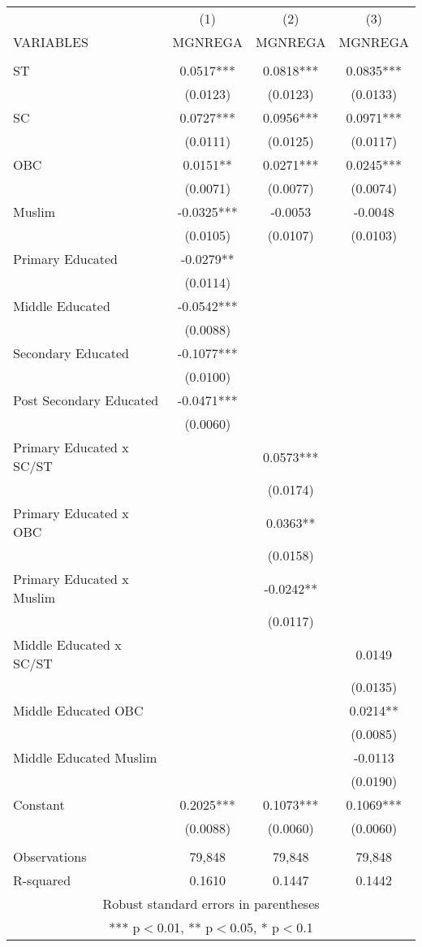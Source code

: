 \documentclass[]{article}
\begin{document}
\begin{tabular}{lccc} \hline
 & (1) & (2) & (3) \\
VARIABLES & MGNREGA & MGNREGA & MGNREGA \\ \hline
 &  &  &  \\
ST & 0.0517*** & 0.0818*** & 0.0835*** \\
 & (0.0123) & (0.0123) & (0.0133) \\
SC & 0.0727*** & 0.0956*** & 0.0971*** \\
 & (0.0111) & (0.0125) & (0.0117) \\
OBC & 0.0151** & 0.0271*** & 0.0245*** \\
 & (0.0071) & (0.0077) & (0.0074) \\
Muslim & -0.0325*** & -0.0053 & -0.0048 \\
 & (0.0105) & (0.0107) & (0.0103) \\
Primary Educated & -0.0279** &  &  \\
 & (0.0114) &  &  \\
Middle Educated & -0.0542*** &  &  \\
 & (0.0088) &  &  \\
Secondary Educated & -0.1077*** &  &  \\
 & (0.0100) &  &  \\
Post Secondary Educated & -0.0471*** &  &  \\
 & (0.0060) &  &  \\
Primary Educated x SC/ST &  & 0.0573*** &  \\
 &  & (0.0174) &  \\
Primary Educated x OBC &  & 0.0363** &  \\
 &  & (0.0158) &  \\
Primary Educated x Muslim &  & -0.0242** &  \\
 &  & (0.0117) &  \\
Middle Educated x SC/ST &  &  & 0.0149 \\
 &  &  & (0.0135) \\
Middle Educated OBC &  &  & 0.0214** \\
 &  &  & (0.0085) \\
Middle Educated Muslim &  &  & -0.0113 \\
 &  &  & (0.0190) \\
Constant & 0.2025*** & 0.1073*** & 0.1069*** \\
 & (0.0088) & (0.0060) & (0.0060) \\
 &  &  &  \\
Observations & 79,848 & 79,848 & 79,848 \\
 R-squared & 0.1610 & 0.1447 & 0.1442 \\ \hline
\multicolumn{4}{c}{ Robust standard errors in parentheses} \\
\multicolumn{4}{c}{ *** p$<$0.01, ** p$<$0.05, * p$<$0.1} \\
\end{tabular}
\end{document}
